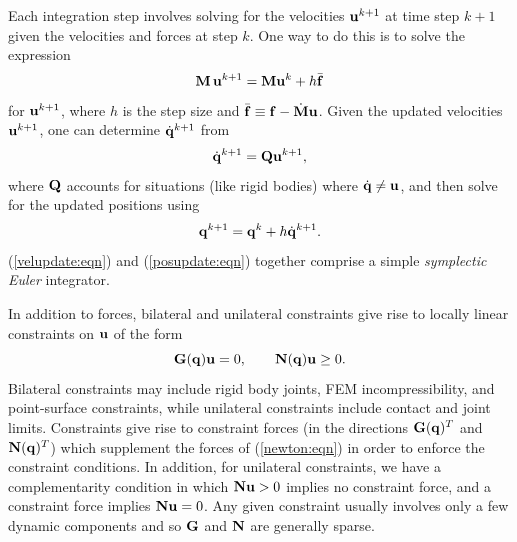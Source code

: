 Each integration step involves solving for
the velocities ${\bf u}^{k+1}$ at time step $k+1$ given the velocities and forces
at step $k$. One way to do this is to solve the expression
%
\begin{equation}
{\bf M} \, {\bf u}^{k+1} = {\bf M} {\bf u}^k + h \bar{{\bf f}}
\label{velupdate:eqn}
\end{equation}
%
for ${\bf u}^{k+1}$, where $h$ is the step size and 
$\bar{{\bf f}} \equiv {\bf f} - \dot{{\bf M}} {\bf u}$. Given the updated velocities ${\bf u}^{k+1}$, one can
determine $\dot{{\bf q}}^{k+1}$ from
%
\begin{equation}
\dot{{\bf q}}^{k+1} = {\bf Q} {\bf u}^{k+1},
\end{equation}
%
where ${\bf Q}$ accounts for situations (like rigid bodies) where $\dot{{\bf q}} \ne
{\bf u}$, and then solve for the updated positions using 
%
\begin{equation}
{\bf q}^{k+1} = {\bf q}^k + h \dot {{\bf q}}^{k+1}.
\label{posupdate:eqn}
\end{equation}
%
(\ref{velupdate:eqn}) and (\ref{posupdate:eqn}) together comprise a
simple {\it symplectic Euler} integrator.

In addition to forces, bilateral and unilateral constraints give rise to
locally linear constraints on ${\bf u}$ of the form
%
\begin{equation}
{\bf G}({\bf q}) {\bf u} = 0, \qquad {\bf N}({\bf q}) {\bf u} \ge 0.
\label{constraints:eqn}
\end{equation}
%
Bilateral constraints may include rigid body joints, FEM
incompressibility, and point-surface constraints, while unilateral
constraints include contact and joint limits.  Constraints give rise
to constraint forces (in the directions ${\bf G}({\bf q})^T$ and ${\bf N}({\bf q})^T$)
which supplement the forces of (\ref{newton:eqn}) in order to enforce
the constraint conditions.  In addition, for unilateral constraints,
we have a complementarity condition in which ${\bf N} {\bf u} > 0$ implies no
constraint force, and a constraint force implies ${\bf N} {\bf u} = 0$.  Any
given constraint usually involves only a few dynamic components and so
${\bf G}$ and ${\bf N}$ are generally sparse.

